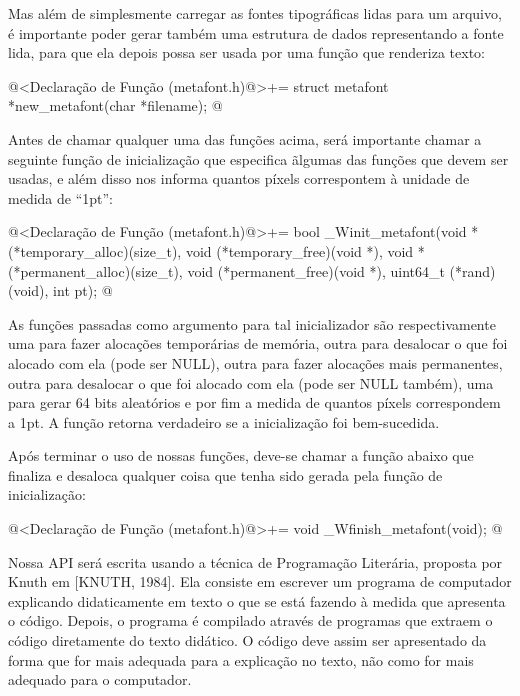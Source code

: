Mas além de simplesmente carregar as fontes tipográficas lidas para um
arquivo, é importante poder gerar também uma estrutura de dados
representando a fonte lida, para que ela depois possa ser usada por
uma função que renderiza texto:

\iniciocodigo
@<Declaração de Função (metafont.h)@>+=
struct metafont *new_metafont(char *filename);
@
\fimcodigo

Antes de chamar qualquer uma das funções acima, será importante chamar
a seguinte função de inicialização que especifica ãlgumas das funções
que devem ser usadas, e além disso nos informa quantos píxels
correspontem à unidade de medida de ``1pt'':



\iniciocodigo
@<Declaração de Função (metafont.h)@>+=
bool _Winit_metafont(void *(*temporary_alloc)(size_t),
                     void (*temporary_free)(void *),
                     void *(*permanent_alloc)(size_t),
                     void (*permanent_free)(void *),
                     uint64_t (*rand)(void), int pt);
@
\fimcodigo

As funções passadas como argumento para tal inicializador são
respectivamente uma para fazer alocações temporárias de memória, outra
para desalocar o que foi alocado com ela (pode ser NULL), outra para
fazer alocações mais permanentes, outra para desalocar o que foi
alocado com ela (pode ser NULL também), uma para gerar 64 bits
aleatórios e por fim a medida de quantos píxels correspondem a 1pt. A
função retorna verdadeiro se a inicialização foi bem-sucedida.

Após terminar o uso de nossas funções, deve-se chamar a função abaixo
que finaliza e desaloca qualquer coisa que tenha sido gerada pela
função de inicialização:

\iniciocodigo
@<Declaração de Função (metafont.h)@>+=
void _Wfinish_metafont(void);
@
\fimcodigo




Nossa API será escrita usando a técnica de Programação Literária,
proposta por Knuth em [KNUTH, 1984]. Ela consiste em escrever um
programa de computador explicando didaticamente em texto o que se está
fazendo à medida que apresenta o código. Depois, o programa é
compilado através de programas que extraem o código diretamente do
texto didático. O código deve assim ser apresentado da forma que for
mais adequada para a explicação no texto, não como for mais adequado
para o computador.

